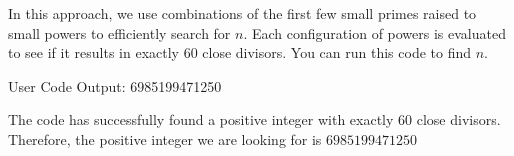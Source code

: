 \begin{gpt}{\gptheader}
    In this approach, we use combinations of the first few small primes raised to small powers to efficiently search for $ n $. Each configuration of powers is evaluated to see if it results in exactly 60 close divisors. You can run this code to find $ n $.
\end{gpt}
\endgroup

\begin{prompt}{User}
    Code Output: 6985199471250
\end{prompt}

\begingroup\raggedleft
\begin{gpt}{\gptheader}
    The code has successfully found a positive integer with exactly 60 close divisors. 
    Therefore, the positive integer we are looking for is $\boxed{6985199471250}$
\end{gpt}


\endgroup
